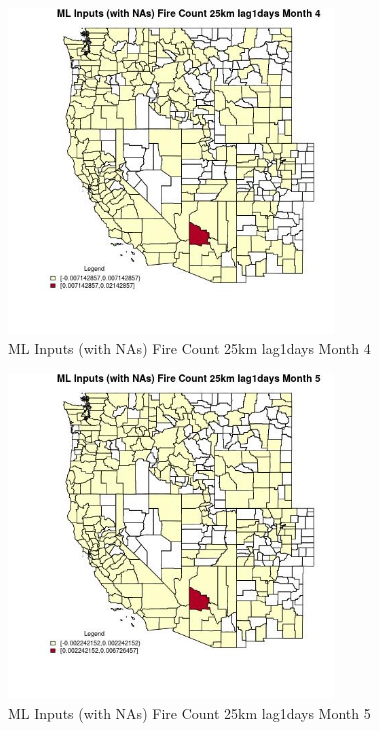 \begin{figure} 
\centering  
\includegraphics[width=0.77\textwidth]{Code_Outputs/Report_ML_input_PM25_Step4_part_e_de_duplicated_aves_compiled_2019-05-21wNAs_CountyFire_Count_25km_lag1daysmedianMonth4.jpg} 
\caption{\label{fig:Report_ML_input_PM25_Step4_part_e_de_duplicated_aves_compiled_2019-05-21wNAsCountyFire_Count_25km_lag1daysmedianMonth4}ML Inputs (with NAs) Fire Count 25km lag1days Month 4} 
\end{figure} 
 

\begin{figure} 
\centering  
\includegraphics[width=0.77\textwidth]{Code_Outputs/Report_ML_input_PM25_Step4_part_e_de_duplicated_aves_compiled_2019-05-21wNAs_CountyFire_Count_25km_lag1daysmedianMonth5.jpg} 
\caption{\label{fig:Report_ML_input_PM25_Step4_part_e_de_duplicated_aves_compiled_2019-05-21wNAsCountyFire_Count_25km_lag1daysmedianMonth5}ML Inputs (with NAs) Fire Count 25km lag1days Month 5} 
\end{figure} 
 

